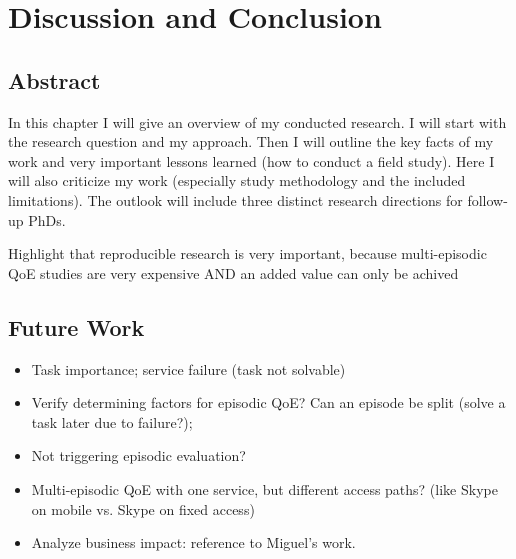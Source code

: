 \chapter{Discussion and Conclusion}\label{chap:09}

\section*{Abstract}
In this chapter I will give an overview of my conducted research.
I will start with the research question and my approach.
Then I will outline the key facts of my work and very important lessons learned (how to conduct a field study).
Here I will also criticize my work (especially study methodology and the included limitations).
The outlook will include three distinct research directions for follow-up PhDs.

Highlight that reproducible research is very important, because multi-episodic QoE studies are very expensive AND an added value can only be achived 

\section{Future Work}
\begin{itemize}
\item Task importance; service failure (task not solvable)
\item Verify determining factors for episodic QoE? Can an episode be split (solve a task later due to failure?);
\item Not triggering episodic evaluation?
\item Multi-episodic QoE with one service, but different access paths? (like Skype on mobile vs. Skype on fixed access)

\item Analyze business impact: reference to Miguel's work.
\end{itemize}